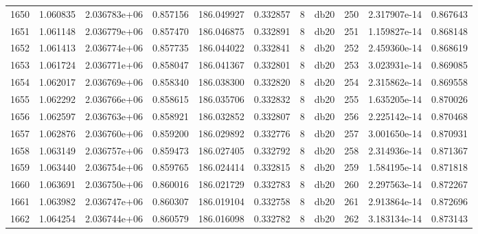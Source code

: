 \begin{tabular}{lrrrrrrlrrr}
1650 &    1.060835 &        2.036783e+06 &  0.857156 &              186.049927 &    0.332857 &       8 &         db20 &    250 &   2.317907e-14 &      0.867643 \\
1651 &    1.061148 &        2.036779e+06 &  0.857470 &              186.046875 &    0.332891 &       8 &         db20 &    251 &   1.159827e-14 &      0.868148 \\
1652 &    1.061413 &        2.036774e+06 &  0.857735 &              186.044022 &    0.332841 &       8 &         db20 &    252 &   2.459360e-14 &      0.868619 \\
1653 &    1.061724 &        2.036771e+06 &  0.858047 &              186.041367 &    0.332801 &       8 &         db20 &    253 &   3.023931e-14 &      0.869085 \\
1654 &    1.062017 &        2.036769e+06 &  0.858340 &              186.038300 &    0.332820 &       8 &         db20 &    254 &   2.315862e-14 &      0.869558 \\
1655 &    1.062292 &        2.036766e+06 &  0.858615 &              186.035706 &    0.332832 &       8 &         db20 &    255 &   1.635205e-14 &      0.870026 \\
1656 &    1.062597 &        2.036763e+06 &  0.858921 &              186.032852 &    0.332807 &       8 &         db20 &    256 &   2.225142e-14 &      0.870468 \\
1657 &    1.062876 &        2.036760e+06 &  0.859200 &              186.029892 &    0.332776 &       8 &         db20 &    257 &   3.001650e-14 &      0.870931 \\
1658 &    1.063149 &        2.036757e+06 &  0.859473 &              186.027405 &    0.332792 &       8 &         db20 &    258 &   2.314936e-14 &      0.871367 \\
1659 &    1.063440 &        2.036754e+06 &  0.859765 &              186.024414 &    0.332815 &       8 &         db20 &    259 &   1.584195e-14 &      0.871818 \\
1660 &    1.063691 &        2.036750e+06 &  0.860016 &              186.021729 &    0.332783 &       8 &         db20 &    260 &   2.297563e-14 &      0.872267 \\
1661 &    1.063982 &        2.036747e+06 &  0.860307 &              186.019104 &    0.332758 &       8 &         db20 &    261 &   2.913864e-14 &      0.872696 \\
1662 &    1.064254 &        2.036744e+06 &  0.860579 &              186.016098 &    0.332782 &       8 &         db20 &    262 &   3.183134e-14 &      0.873143 \\

\end{tabular}
